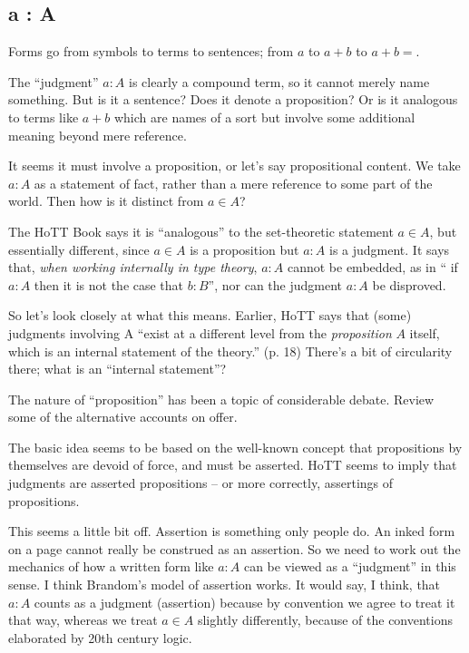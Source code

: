 \subsection{a : A}
\label{subs:aA}

Forms go from symbols to terms to sentences; from \(a\) to \(a+b\) to
\(a+b=\).

The ``judgment'' \(a : A\) is clearly a compound term, so it cannot
merely name something.  But is it a sentence?  Does it denote a
proposition?  Or is it analogous to terms like \(a+b\) which are names
of a sort but involve some additional meaning beyond mere reference.

It seems it must involve a proposition, or let's say propositional
content.  We take \(a : A\) as a statement of fact, rather than a mere
reference to some part of the world.  Then how is it distinct from
\(a\in A\)?

The HoTT Book says it is ``analogous'' to the set-theoretic statement
\(a\in A\), but essentially different, since \(a\in A\) is a
proposition but \(a : A\) is a judgment.  It says that, \textit{when
  working internally in type theory}, \(a : A\) cannot be embedded, as
in `` if \(a : A\) then it is not the case that \(b : B\)'', nor can
the judgment \(a : A\) be disproved.

So let's look closely at what this means.  Earlier, HoTT says that
(some) judgments involving A ``exist at a different level from the
\textit{proposition} \(A\) itself, which is an internal statement of
the theory.''  (p. 18) There's a bit of circularity there; what is an
``internal statement''?

{\todo The nature of ``proposition'' has been a topic of
  considerable debate.  Review some of the alternative accounts on
  offer.}


The basic idea seems to be based on the well-known concept that
propositions by themselves are devoid of force, and must be asserted.
HoTT seems to imply that judgments are asserted propositions -- or
more correctly, assertings of propositions.

This seems a little bit off.  Assertion is something only people do.
An inked form on a page cannot really be construed as an assertion.
So we need to work out the mechanics of how a written form like \(a :
A\) can be viewed as a ``judgment'' in this sense.  I think Brandom's
model of assertion works.  It would say, I think, that \(a : A\)
counts as a judgment (assertion) because by convention we agree to
treat it that way, whereas we treat \(a\in A\) slightly differently,
because of the conventions elaborated by 20th century logic.

